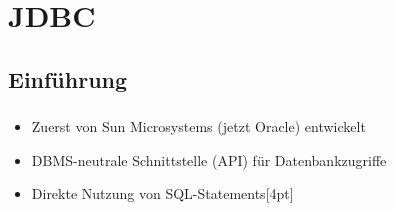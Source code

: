 \section{JDBC}
\subsection{Einführung}

\begin{frame}[t]
\frametitle{\insertsection}
\framesubtitle{\insertsubsection}
\onslide
\begin{itemize}
	\item Zuerst von Sun Microsystems (jetzt Oracle) entwickelt
	\item DBMS-neutrale Schnittstelle (API) f\"ur Datenbankzugriffe
	\item Direkte Nutzung von SQL-Statements[4pt]
\end{itemize}
\end{frame}

